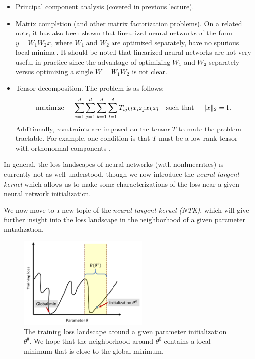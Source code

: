 \begin{itemize}
    \item Principal component analysis (covered in previous lecture).
    \item Matrix completion (and other matrix factorization problems). On a related note, it has also been shown that linearized neural networks of the form $y = W_1W_2x$, where $W_1$ and $W_2$ are optimized separately, have no spurious local minima \cite{baldi1989neural}. It should be noted that linearized neural networks are not very useful in practice since the advantage of optimizing $W_1$ and $W_2$ separately versus optimizing a single $W=W_1W_2$ is not clear.
    \item Tensor decomposition. The problem is as follows:
    \begin{align}
        \text{maximize }\quad \sum_{i=1}^d \sum_{j=1}^d \sum_{k=1}^d \sum_{l=1}^d T_{ijkl} x_ix_jx_kx_l \quad \text{such that } \quad \|x\|_2 = 1.
    \end{align}
    Additionally, constraints are imposed on the tensor $T$ to make the problem tractable. For example, one condition is that $T$ must be a low-rank tensor with orthonormal components \cite{ge2015}.
\end{itemize}

In general, the loss landscapes of neural networks (with nonlinearities) is currently not as well understood, though we now introduce the \textit{neural tangent kernel} which allows us to make some characterizations of the loss near a given neural network initialization.

We now move to a new topic of the \textit{neural tangent kernel (NTK)}, which will give further insight into the loss landscape in the neighborhood of a given parameter initialization.

\begin{figure}
    \centering
    \includegraphics[width=2.5in]{figures/ntk-loss-landscape.png}
    \caption{The training loss landscape around a given parameter initialization $\theta^0$. We hope that the neighborhood around $\theta^0$ contains a local minimum that is close to the global minimum.}
    \label{lec11:fig:ntk_loss_landscape}
\end{figure}


